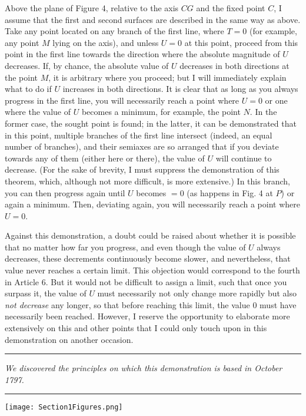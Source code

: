 \documentclass[12pt]{memoir}
\theoremstyle{plain}
\theoremstyle{remark}
\begin{document}
Above the plane of Figure 4, relative to the axis \(CG\) and the fixed point \(C\), I assume that the first and second surfaces are described in the same way as above. Take any point located on any branch of the first line, where \(T = 0\) (for example, any point \(M\) lying on the axis), and unless \(U = 0\) at this point, proceed from this point in the first line towards the direction where the absolute magnitude of \(U\) decreases. If, by chance, the absolute value of \(U\) decreases in both directions at the point \(M\), it is arbitrary where you proceed; but I will immediately explain what to do if \(U\) increases in both directions. It is clear that as long as you always progress in the first line, you will necessarily reach a point where \(U = 0\) or one where the value of \(U\) becomes a minimum, for example, the point \(N\). In the former case, the sought point is found; in the latter, it can be demonstrated that in this point, multiple branches of the first line intersect (indeed, an equal number of branches), and their semiaxes are so arranged that if you deviate towards any of them (either here or there), the value of \(U\) will continue to decrease. (For the sake of brevity, I must suppress the demonstration of this theorem, which, although not more difficult, is more extensive.) In this branch, you can then progress again until \(U\) becomes \(= 0\) (as happens in Fig. 4 at \(P\)) or again a minimum. Then, deviating again, you will necessarily reach a point where \(U = 0\).

Against this demonstration, a doubt could be raised about whether it is possible that no matter how far you progress, and even though the value of \(U\) always decreases, these decrements continuously become slower, and nevertheless, that value never reaches a certain limit. This objection would correspond to the fourth in Article 6. But it would not be difficult to assign a limit, such that once you surpass it, the value of \(U\) must necessarily not only change more rapidly but also \textit{not decrease} any longer, so that before reaching this limit, the value \(0\) must have necessarily been reached. However, I reserve the opportunity to elaborate more extensively on this and other points that I could only touch upon in this demonstration on another occasion.

\begin{center}

 \rule{3in}{0.5pt}

\begin{scriptsize}\textit{We discovered the principles on which this demonstration is based in October 1797.}\end{scriptsize}

 \rule{2in}{0.5pt}
\end{center}
\pagebreak
\begin{center}
\texttt{[image: Section1Figures.png]}
\end{center}

 
\end{document}

